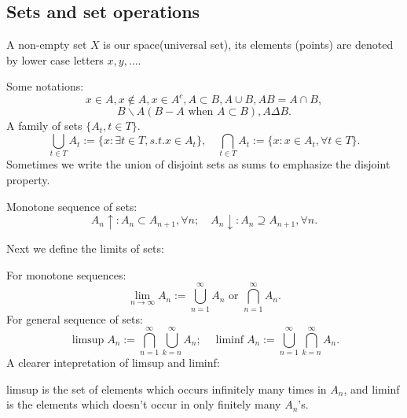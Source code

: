 \subsection{Sets and set operations}
\label{sub:Sets and set operations}
\begin{definition}
	A non-empty set $X$ is our space(universal set),
	its elements (points) are denoted by
	lower case letters $x,y,\dots$.

	Some notations:
	\[
	x\in A, x\notin A, x\in A^c, A \subset B, A\cup B, AB = A\cap B,
	\]
	\[
	B\backslash A (B - A\text{ when } A \subset B), A\Delta B.
	\]
	A family of sets $\{A_t, t\in T\}$.
	\[
	\bigcup_{t\in T}A_t := \{x: \exists t\in T, s.t. x\in A_t\},\quad
	\bigcap_{t\in T}A_t := \{x: x\in A_t, \forall t\in T\}.
	\]
	Sometimes we write the union of disjoint sets as sums to
	emphasize the disjoint property.

	Monotone sequence of sets:
	\[
	A_n\uparrow: A_n \subset A_{n+1}, \forall n;\quad
	A_n \downarrow:	A_n \supseteq A_{n+1}, \forall n.
	\]
\end{definition}

Next we define the limits of sets:
\begin{definition}
	For monotone sequences:
	\[
	\lim_{n\to \infty}A_n := \bigcup_{n=1}^\infty A_n \text{ or }
	\bigcap_{n=1}^\infty A_n.
	\]
	For general sequence of sets:
	\[
	\limsup A_n := \bigcap_{n=1}^\infty \bigcup_{k=n}^\infty A_n;\quad
	\liminf A_n := \bigcup_{n=1}^\infty \bigcap_{k=n}^\infty A_n.
	\]
	A clearer intepretation of limsup and liminf:

	limsup is the set of elements which occurs infinitely many times in $A_n$,
	and liminf is the elements which doesn't occur in only finitely many $A_n$'s.
\end{definition}

